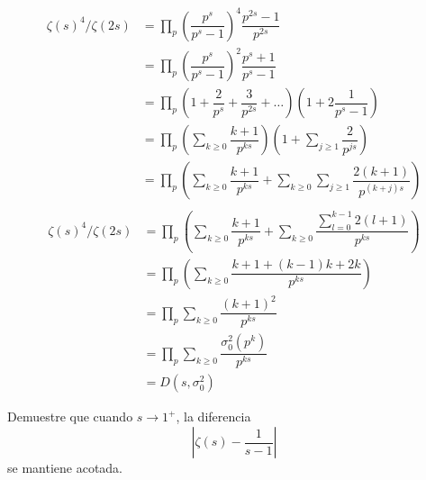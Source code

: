 \begin{sol}
\begin{enumerate}[label = (\roman*)]
        \begin{align*}
            \zeta(s)^4/\zeta(2s) &= \prod_p \left(\dfrac{p^s}{p^s-1}\right)^4\dfrac{p^{2s}-1}{p^{2s}}\\
            &= \prod_p \left(\dfrac{p^{s}}{p^s-1}\right)^2\dfrac{p^s+1}{p^s-1}\\
            &= \prod_p \left(1 + \dfrac{2}{p^s} + \dfrac{3}{p^{2s}} + \ldots\right)\left(1 + 2\dfrac{1}{p^s-1}\right)\\
            &=\prod_p \left(\sum_{k \geq 0} \dfrac{k+1}{p^{ks}}\right)\left(1 + \sum_{j \geq 1} \dfrac{2}{p^{js}}\right)\\
            &= \prod_p \left(\sum_{k \geq 0} \dfrac{k+1}{p^{ks}} + \sum_{k \geq 0}\sum_{j \geq 1} \dfrac{2(k+1)}{p^{(k+j)s}}\right)\\
        \end{align*}
        \begin{align*}
            \zeta(s)^4/\zeta(2s) &= \prod_p \left(\sum_{k \geq 0} \dfrac{k+1}{p^{ks}} + \sum_{k \geq 0} \dfrac{\sum_{l=0}^{k-1} 2(l+1)}{p^{ks}}\right)\\
            &= \prod_p \left(\sum_{k \geq 0} \dfrac{k+1 + (k-1)k + 2k}{p^{ks}}\right)\\
            &= \prod_p \sum_{k \geq 0} \dfrac{(k+1)^2}{p^{ks}}\\
            &= \prod_p \sum_{k \geq 0} \dfrac{\sigma_0^2(p^k)}{p^{ks}}\\
            &= D(s,\sigma_0^2)
        \end{align*}
    \end{enumerate}
\end{sol}

\begin{prob}[3 pts.]
    Demuestre que cuando $s\rightarrow1^+$, la diferencia
    \[\left|\zeta(s)-\frac{1}{s-1}\right|\]
    se mantiene acotada.
\end{prob}

